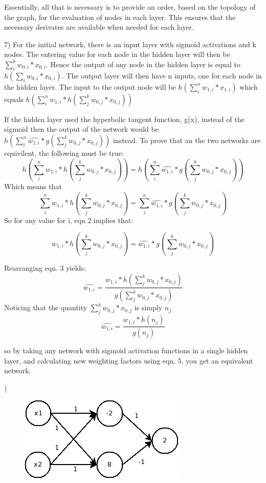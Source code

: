 \documentclass[12pt]{article}
\begin{document}
Essentially, all that is necessary is to provide an order, based on the topology of the graph, for the evaluation of nodes in each layer. 
This ensures that the necessary derivates are available when needed for each layer. 

\pagebreak
\setcounter{equation}{0}
7) For the initial network, there is an input layer with sigmoid activations and k nodes. The entering value for each node in the 
hidden layer will then be $\sum_i^k w_{0,i}*x_{0,i}$. Hence the output of any node in the hidden layer is equal to 
$h(\sum_i w_{0,i}*x_{0,i})$. The output layer will then have n inputs, one for each node in the hidden layer. 
The input to the output node will be $h(\sum_i^n w_{1,i}*x_{1,i})$ which equals $h(\sum_i^n w_{1,i}*h(\sum_j^k w_{0,j}*x_{0,j}))$

If the hidden layer used the hyperbolic tangent function, g(x), instead of the sigmoid then the output of the network would be 
$h(\sum_i^n \hat{w_{1,i}}*g(\sum_j^k w_{0,j}*x_{0,j}))$ instead. To prove that an the two networks are equivilent, the following must be 
true: 
\begin{equation}
    h(\sum_i^n w_{1,i}*h(\sum_j^k w_{0,j}*x_{0,j})) = h(\sum_i^n \hat{w_{1,i}}*g(\sum_j^k w_{0,j}*x_{0,j}))
\end{equation}
Which means that 
\begin{equation}
    \sum_i^n w_{1,i}*h(\sum_j^k w_{0,j}*x_{0,j}) = \sum_i^n \hat{w_{1,i}}*g(\sum_j^k w_{0,j}*x_{0,j})
\end{equation}
So for any value for i, eqn 2 implies that: 

\begin{equation}
    w_{1,i}*h(\sum_j^k w_{0,j}*x_{0,j}) = \hat{w_{1,i}}*g(\sum_j^k w_{0,j}*x_{0,j})
\end{equation}

Rearranging eqn. 3 yields: 
\begin{equation}
     \hat{w_{1,i}} = \frac{w_{1,i}*h(\sum_j^k w_{0,j}*x_{0,j})}{g(\sum_j^k w_{0,j}*x_{0,j})}
\end{equation}
Noticing that the quantity $\sum_j^k w_{0,j}*x_{0,j}$ is simply $n_j$
\begin{equation}
     \hat{w_{1,i}} = \frac{w_{1,i}*h(n_j)}{g(n_j)}
\end{equation}

so by taking any network with sigmoid activation functions in a single hidden layer, and calculating new 
weighting factors using eqn. 5, you get an equivalent network. 

) 
    \begin{figure}[htb!]
        \includegraphics[width=.5\textwidth]{q7}
    \end{figure}
    
\end{document}
